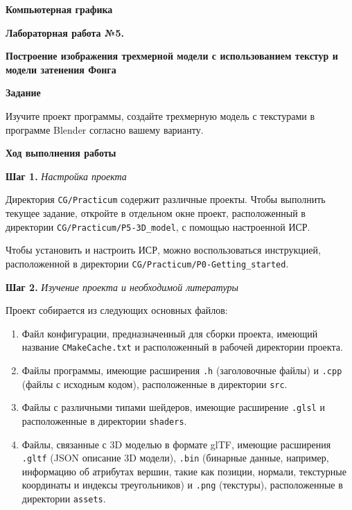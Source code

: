 \documentclass[a4paper,12pt]{article}
\begin{document}
\fontsize{14pt}{16pt}\selectfont
\begin{center}
    \textbf{{\Large Компьютерная графика}}
    
    \textbf{{\large Лабораторная работа №5. }}
    
    \textbf{{\large Построение изображения трехмерной модели с использованием текстур и модели затенения Фонга}}
    \end{center}
    
    \textbf{Задание}
    
    Изучите проект программы, создайте трехмерную модель с текстурами в программе Blender согласно вашему варианту.
    
    \textbf{Ход выполнения работы}
    
    \textbf{Шаг 1.} \textit{Настройка проекта}
    
    Директория \texttt{CG/Practicum} содержит различные проекты. Чтобы выполнить текущее задание, откройте в отдельном окне проект, расположенный в директории \texttt{CG/Practicum/P5-3D\_model}, с помощью настроенной ИСР.
    
    Чтобы установить и настроить ИСР, можно воспользоваться инструкцией, расположенной в директории \texttt{CG/Practicum/P0-Getting\_started}.
    
    \textbf{Шаг 2.} \textit{Изучение проекта и необходимой литературы}
    
    Проект собирается из следующих основных файлов:
    
    \begin{enumerate}
        \item Файл конфигурации, предназначенный для сборки проекта, имеющий название \texttt{CMakeCache.txt} и расположенный в рабочей директории проекта.
        \item Файлы программы, имеющие расширения \texttt{.h} (заголовочные файлы) и \texttt{.cpp} (файлы с исходным кодом), расположенные в директории \texttt{src}.
        \item Файлы с различными типами шейдеров, имеющие расширение \texttt{.glsl} и расположенные в директории \texttt{shaders}.
        \item Файлы, связанные с 3D моделью в формате glTF, имеющие расширения \texttt{.gltf} (JSON описание 3D модели), \texttt{.bin} (бинарные данные, например, информацию об атрибутах вершин, такие как позиции, нормали, текстурные координаты и индексы треугольников) и \texttt{.png} (текстуры), расположенные в директории \texttt{assets}.
    \end{enumerate}
    
\end{document}
